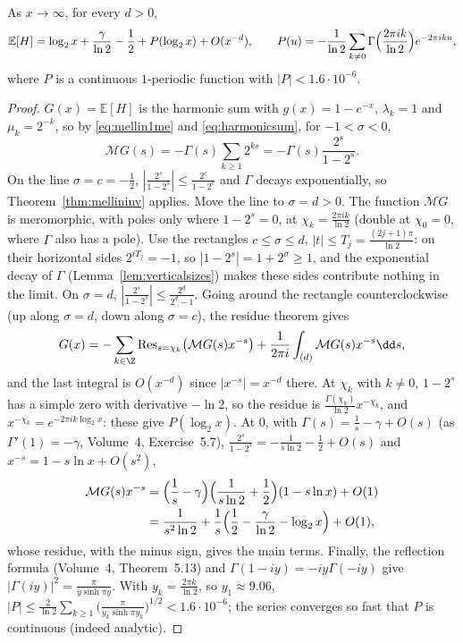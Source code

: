 \begin{theorem}\label{thm:maxgeom}
As $x\to\infty$, for every $d>0$,
\[
\mathbb E[H]=\log_2x+\frac\gamma{\ln2}-\frac12+P(\log_2x)+O(x^{-d}),\qquad P(u)=-\frac1{\ln2}\sum_{k\ne0}\Gamma\Bigl(\frac{2\pi ik}{\ln2}\Bigr)e^{-2\pi iku},
\]
where $P$ is a continuous $1$-periodic function with $|P|<1.6\cdot10^{-6}$.
\end{theorem}
\begin{proof}
$G(x)=\mathbb E[H]$ is the harmonic sum with $g(x)=1-e^{-x}$, $\lambda_k=1$ and $\mu_k=2^{-k}$, so by \eqref{eq:mellin1me} and \eqref{eq:harmonicsum}, for $-1<\sigma<0$,
\[
\mathcal MG(s)=-\Gamma(s)\sum_{k\ge1}2^{ks}=-\Gamma(s)\frac{2^s}{1-2^s}.
\]
On the line $\sigma=c=-\frac12$, $|\frac{2^s}{1-2^s}|\le\frac{2^c}{1-2^c}$ and $\Gamma$ decays exponentially, so Theorem~\ref{thm:mellininv} applies. Move the line to $\sigma=d>0$. The function $\mathcal MG$ is meromorphic, with poles
only where $1-2^s=0$, at $\chi_k=\frac{2\pi ik}{\ln2}$ (double at $\chi_0=0$, where $\Gamma$ also has a pole). Use the rectangles $c\le\sigma\le d$, $|t|\le T_j=\frac{(2j+1)\pi}{\ln2}$: on their horizontal sides $2^{iT_j}=-1$, so
$|1-2^s|=1+2^\sigma\ge1$, and the exponential decay of $\Gamma$ (Lemma~\ref{lem:verticalsizes}) makes these sides contribute nothing in the limit. On $\sigma=d$, $|\frac{2^s}{1-2^s}|\le\frac{2^d}{2^d-1}$. Going around the
rectangle counterclockwise (up along $\sigma=d$, down along $\sigma=c$), the residue theorem gives
\[
G(x)=-\sum_{k\in\Z}\operatorname{Res}_{s=\chi_k}\bigl(\mathcal MG(s)x^{-s}\bigr)+\frac1{2\pi i}\int_{(d)}\mathcal MG(s)x^{-s}\dd s,
\]
and the last integral is $O(x^{-d})$ since $|x^{-s}|=x^{-d}$ there. At $\chi_k$ with $k\ne0$, $1-2^s$ has a simple zero with derivative $-\ln2$, so the residue is $\frac{\Gamma(\chi_k)}{\ln2}x^{-\chi_k}$, and
$x^{-\chi_k}=e^{-2\pi ik\log_2x}$: these give $P(\log_2x)$. At $0$, with $\Gamma(s)=\frac1s-\gamma+O(s)$ (as $\Gamma'(1)=-\gamma$, Volume~4, Exercise~5.7), $\frac{2^s}{1-2^s}=-\frac1{s\ln2}-\frac12+O(s)$ and $x^{-s}=1-s\ln x+O(s^2)$,
\[
\begin{aligned}\mathcal MG(s)x^{-s}&=\Bigl(\frac1s-\gamma\Bigr)\Bigl(\frac1{s\ln2}+\frac12\Bigr)(1-s\ln x)+O(1)\\&=\frac1{s^2\ln2}+\frac1s\Bigl(\frac12-\frac\gamma{\ln2}-\log_2x\Bigr)+O(1),\end{aligned}
\]
whose residue, with the minus sign, gives the main terms. Finally, the reflection formula (Volume~4, Theorem~5.13) and $\Gamma(1-iy)=-iy\Gamma(-iy)$ give $|\Gamma(iy)|^2=\frac\pi{y\sinh\pi y}$. With $y_k=\frac{2\pi k}{\ln2}$, so
$y_1\approx9.06$, $|P|\le\frac2{\ln2}\sum_{k\ge1}\bigl(\frac\pi{y_k\sinh\pi y_k}\bigr)^{1/2}<1.6\cdot10^{-6}$; the series converges so fast that $P$ is continuous (indeed analytic).
\end{proof}


